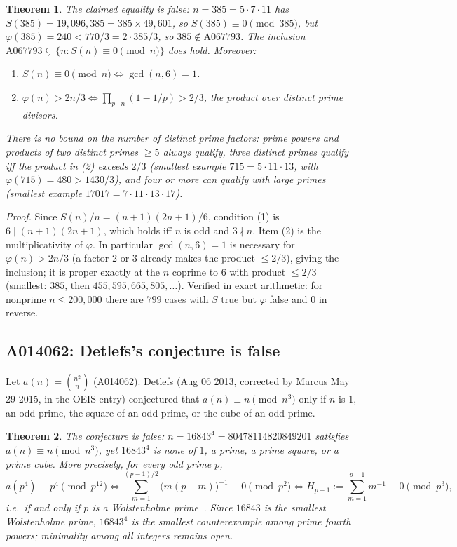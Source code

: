 \documentclass[11pt]{article}
\newtheorem{theorem}{Theorem}[section]
\begin{document}
\begin{theorem}
The claimed equality is false: $n = 385 = 5 \cdot 7 \cdot 11$ has
$S(385) = 19{,}096{,}385 = 385 \times 49{,}601$, so $S(385) \equiv 0
\pmod{385}$, but $\varphi(385) = 240 < 770/3 = 2 \cdot 385/3$, so
$385 \notin \mathrm{A067793}$. The inclusion
$\mathrm{A067793} \subsetneq \{n : S(n) \equiv 0 \pmod n\}$ does hold.
Moreover:
\begin{enumerate}
\item $S(n) \equiv 0 \pmod n \iff \gcd(n, 6) = 1$.
\item $\varphi(n) > 2n/3 \iff \prod_{p \mid n} (1 - 1/p) > 2/3$, the
product over distinct prime divisors.
\end{enumerate}
There is no bound on the number of distinct prime factors: prime
powers and products of two distinct primes $\ge 5$ always qualify,
three distinct primes qualify iff the product in (2) exceeds $2/3$
(smallest example $715 = 5 \cdot 11 \cdot 13$, with
$\varphi(715) = 480 > 1430/3$), and four or more can qualify with
large primes (smallest example $17017 = 7 \cdot 11 \cdot 13
\cdot 17$).
\end{theorem}

\emph{Proof.} Since $S(n)/n = (n+1)(2n+1)/6$, condition (1) is
$6 \mid (n+1)(2n+1)$, which holds iff $n$ is odd and $3 \nmid n$.
Item (2) is the multiplicativity of $\varphi$. In particular
$\gcd(n,6) = 1$ is necessary for $\varphi(n) > 2n/3$ (a factor $2$ or
$3$ already makes the product $\le 2/3$), giving the inclusion; it is
proper exactly at the $n$ coprime to $6$ with product $\le 2/3$
(smallest: $385$, then $455, 595, 665, 805, \dots$). Verified in exact
arithmetic: for nonprime $n \le 200{,}000$ there are $799$ cases with
$S$ true but $\varphi$ false and $0$ in reverse.

\subsection{A014062: Detlefs's conjecture is false}
\label{sec:a014062}
Let $a(n) = \binom{n^2}{n}$ (A014062). Detlefs (Aug 06 2013, corrected
by Marcus May 29 2015, in the OEIS entry) conjectured that
$a(n) \equiv n \pmod{n^3}$ only if $n$ is $1$, an odd prime, the
square of an odd prime, or the cube of an odd prime.

\begin{theorem}\label{thm:A014062}
The conjecture is false: $n = 16843^4 = 80478114820849201$ satisfies $a(n) \equiv n \pmod{n^3}$, yet $16843^4$ is none of $1$, a prime, a prime square, or a prime cube. More precisely, for every odd prime $p$,
\[
  a(p^4) \equiv p^4 \pmod{p^{12}}
  \iff \sum_{m=1}^{(p-1)/2} \bigl(m(p-m)\bigr)^{-1} \equiv 0 \pmod{p^2}
  \iff H_{p-1} := \sum_{m=1}^{p-1} m^{-1} \equiv 0 \pmod{p^3},
\]
i.e.\ if and only if $p$ is a Wolstenholme prime~\cite{McIntosh1995}. Since $16843$ is the smallest Wolstenholme prime, $16843^4$ is the smallest counterexample among prime fourth powers; minimality among all integers remains open.
\end{theorem}
\end{document}
